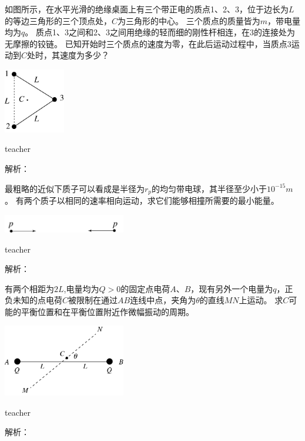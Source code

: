 \begin{example}
如图所示，在水平光滑的绝缘桌面上有三个带正电的质点1、2、3，位于边长为$L$的等边三角形的三个顶点处，$C$为三角形的中心。
三个质点的质量皆为$m$，带电量均为$q$。
质点1、3之间和2、3之间用绝缘的轻而细的刚性杆相连，在3的连接处为无摩擦的铰链。
已知开始时三个质点的速度为零，在此后运动过程中，当质点3运动到$C$处时，其速度为多少？
\begin{flushright}
\includegraphics[width=0.2\textwidth]{images/elec-problem-10.pdf}
\end{flushright}
\begin{taggedblock}{teacher}

解析：
\end{taggedblock}
\end{example}

\begin{example}
最粗略的近似下质子可以看成是半径为$r_p$的均匀带电球，其半径至少小于$10^{-15}\unit{m}$。
有两个质子以相同的速率相向运动，求它们能够相撞所需要的最小能量。
\begin{flushright}
\includegraphics[width=0.4\textwidth]{images/elec-problem-9.pdf}
\end{flushright}
\begin{taggedblock}{teacher}

解析：
\end{taggedblock}
\end{example}

\begin{example}
有两个相距为$2L$,电量均为$Q>0$的固定点电荷$A$、$B$，现有另外一个电量为$q$，正负未知的点电荷$C$被限制在通过$AB$连线中点，夹角为$\theta$的直线$MN$上运动。
求$C$可能的平衡位置和在平衡位置附近作微幅振动的周期。
\begin{flushright}
\includegraphics[width=0.4\textwidth]{images/elec-problem-7.pdf}
\end{flushright}
\begin{taggedblock}{teacher}

解析：
\end{taggedblock}
\end{example}

